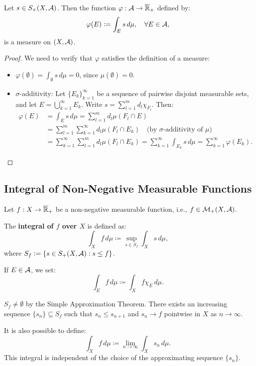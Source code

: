 \begin{proposition}
Let $s \in S_+(X, \mathcal{A})$. Then the function $\varphi : \mathcal{A} \to \overline{\mathbb{R}}_+$ defined by:
\[
\varphi(E) \mathrel{\mathop:}= \int_E s \, d\mu, \quad \forall E \in \mathcal{A},
\]
is a measure on $(X, \mathcal{A})$.
\end{proposition}

\begin{proof}
We need to verify that $\varphi$ satisfies the definition of a measure:

\begin{itemize}
    \item $\varphi(\emptyset) = \int_\emptyset s \, d\mu = 0$, since $\mu(\emptyset) = 0$.
    
    \item $\sigma$-additivity: Let $\{E_k\}_{k=1}^\infty$ be a sequence of pairwise disjoint measurable sets, and let $E = \bigcup_{k=1}^\infty E_k$. Write $s = \sum_{l=1}^m d_l \chi_{F_l}$. Then:
    \begin{align*}
    \varphi(E) &= \int_E s \, d\mu = \sum_{l=1}^m d_l \mu(F_l \cap E) \\
    &= \sum_{l=1}^m \sum_{k=1}^\infty d_l \mu(F_l \cap E_k) \quad \text{(by $\sigma$-additivity of $\mu$)} \\
    &= \sum_{k=1}^\infty \sum_{l=1}^m d_l \mu(F_l \cap E_k) = \sum_{k=1}^\infty \int_{E_k} s \, d\mu = \sum_{k=1}^\infty \varphi(E_k).
    \end{align*}
\end{itemize}
\end{proof}

\clearpage
\subsection{Integral of Non-Negative Measurable Functions}

Let $f: X \to \overline{\mathbb{R}}_+$ be a non-negative measurable function, i.e., $f \in \mathcal{M}_+(X, \mathcal{A})$.

\begin{definition}
The \textbf{integral of $f$ over $X$} is defined as:
\[
\int_X f \, d\mu \coloneqq \sup_{s \in S_f} \int_X s \, d\mu,
\]
where $S_f \mathrel{\mathop:}= \{s \in S_+(X, \mathcal{A}) : s \leq f\}$.

If $E \in \mathcal{A}$, we set:
\[
\int_E f \, d\mu \coloneqq \int_X f\chi_E \, d\mu.
\]
\end{definition}

\begin{remark}
$S_f \neq \emptyset$ by the Simple Approximation Theorem. There exists an increasing sequence $\{s_n\} \subseteq S_f$ such that $s_n \leq s_{n+1}$ and $s_n \to f$ pointwise in $X$ as $n \to \infty$.

It is also possible to define:
\[
\int_X f \, d\mu \coloneqq \lim_{n \to \infty} \int_X s_n \, d\mu.
\]
This integral is independent of the choice of the approximating sequence $\{s_n\}$.
\end{remark}

